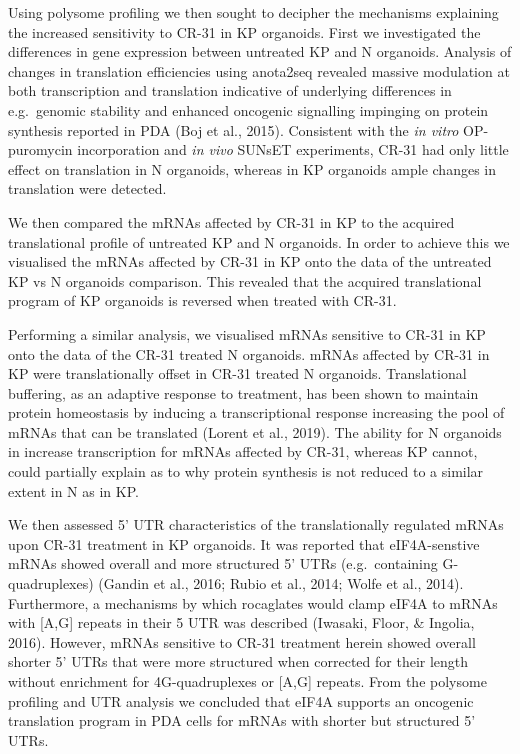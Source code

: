 \documentclass[
  12pt,
  openany]{book}
\begin{document}
Using polysome profiling we then sought to decipher the mechanisms explaining the increased sensitivity to CR-31 in KP organoids. First we investigated the differences in gene expression between untreated KP and N organoids. Analysis of changes in translation efficiencies using anota2seq revealed massive modulation at both transcription and translation indicative of underlying differences in e.g.~genomic stability and enhanced oncogenic signalling impinging on protein synthesis reported in PDA (Boj et al., 2015). Consistent with the \emph{in vitro} OP-puromycin incorporation and \emph{in vivo} SUNsET experiments, CR-31 had only little effect on translation in N organoids, whereas in KP organoids ample changes in translation were detected.

We then compared the mRNAs affected by CR-31 in KP to the acquired translational profile of untreated KP and N organoids. In order to achieve this we visualised the mRNAs affected by CR-31 in KP onto the data of the untreated KP vs N organoids comparison. This revealed that the acquired translational program of KP organoids is reversed when treated with CR-31.

Performing a similar analysis, we visualised mRNAs sensitive to CR-31 in KP onto the data of the CR-31 treated N organoids. mRNAs affected by CR-31 in KP were translationally offset in CR-31 treated N organoids. Translational buffering, as an adaptive response to treatment, has been shown to maintain protein homeostasis by inducing a transcriptional response increasing the pool of mRNAs that can be translated (Lorent et al., 2019). The ability for N organoids in increase transcription for mRNAs affected by CR-31, whereas KP cannot, could partially explain as to why protein synthesis is not reduced to a similar extent in N as in KP.

We then assessed 5' UTR characteristics of the translationally regulated mRNAs upon CR-31 treatment in KP organoids. It was reported that eIF4A-senstive mRNAs showed overall and more structured 5' UTRs (e.g.~containing G-quadruplexes) (Gandin et al., 2016; Rubio et al., 2014; Wolfe et al., 2014). Furthermore, a mechanisms by which rocaglates would clamp eIF4A to mRNAs with {[}A,G{]} repeats in their 5 UTR was described (Iwasaki, Floor, \& Ingolia, 2016). However, mRNAs sensitive to CR-31 treatment herein showed overall shorter 5' UTRs that were more structured when corrected for their length without enrichment for 4G-quadruplexes or {[}A,G{]} repeats. From the polysome profiling and UTR analysis we concluded that eIF4A supports an oncogenic translation program in PDA cells for mRNAs with shorter but structured 5' UTRs.
\end{document}

